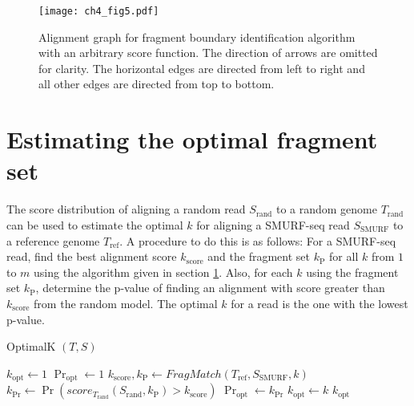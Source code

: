 \begin{figure}[h!]
\centering
\texttt{[image: ch4\_fig5.pdf]}
\caption{Alignment graph for fragment boundary identification algorithm
  with an arbitrary score function. The direction of arrows are omitted
  for clarity. The horizontal edges are directed from left to right and
  all other edges are directed from top to bottom.}
\label{frag_alg}
\end{figure}


\section{Estimating the optimal fragment set}
The score distribution of aligning a random read $S_\mathrm{rand}$ to a
random genome $T_\mathrm{rand}$ can be used to estimate the optimal $k$
for aligning a SMURF-seq read $S_\mathrm{SMURF}$ to a reference genome
$T_\mathrm{ref}$.
A procedure to do this is as follows: For a SMURF-seq read, find the
best alignment score $k_\mathrm{score}$ and the fragment set
$k_\mathrm{P}$ for all $k$ from $1$ to $m$ using the algorithm given
in section \ref{}. Also, for each $k$ using the fragment set
$k_\mathrm{P}$, determine the p-value of finding an alignment with score
greater than $k_\mathrm{score}$ from the random model. The optimal $k$
for a read is the one with the lowest p-value.

\begin{algorithm}[H]
\caption{OptimalK $(T,S)$}
\begin{algorithmic}[1]
  \STATE $k_\mathrm{opt} \leftarrow 1$
  \STATE $\Pr_\mathrm{opt} \leftarrow 1$
    \STATE $k_\mathrm{score}, k_\mathrm{P} \leftarrow
              FragMatch(T_\mathrm{ref},S_\mathrm{SMURF},k)$
    \STATE $k_{\Pr} \leftarrow \Pr(score_{T_\mathrm{rand}}
              (S_\mathrm{rand},k_\mathrm{P}) > k_\mathrm{score})$
      \STATE $\Pr_\mathrm{opt} \leftarrow k_{\Pr}$
      \STATE $k_\mathrm{opt} \leftarrow k$
    \ENDIF
  \ENDFOR
  \RETURN $k_\mathrm{opt}$
\end{algorithmic}
\end{algorithm}

